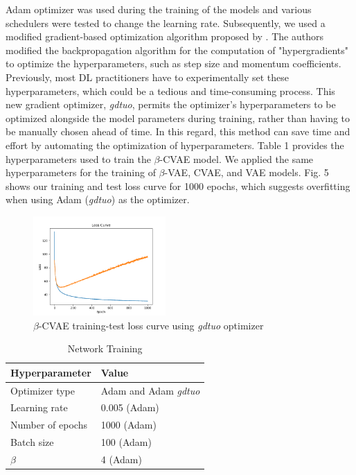 Adam optimizer was used during the training of the models and various schedulers were tested to change the learning rate. Subsequently, we used a modified gradient-based optimization algorithm proposed by \cite{DBLP:journals/corr/abs-1909-13371}. The authors modified the backpropagation algorithm for the computation of "hypergradients" to optimize the hyperparameters, such as step size and momentum coefficients. Previously, most DL practitioners have to experimentally set these hyperparameters, which could be a tedious and time-consuming process. This new gradient optimizer, \textit{gdtuo}, permits the optimizer's hyperparameters to be optimized alongside the model parameters during training, rather than having to be manually chosen ahead of time. In this regard, this method can save time and effort by automating the optimization of hyperparameters. Table 1 provides the hyperparameters used to train the $\beta$-CVAE model. We applied the same hyperparameters for the training of $\beta$-VAE, CVAE, and VAE models. Fig. 5 shows our training and test loss curve for 1000 epochs, which suggests overfitting when using  Adam (\textit{gdtuo}) as the optimizer.

\begin{figure}[htbp]
    \centerline{\includegraphics[width=0.45\textwidth]{overfitting.png}}
    \caption{$\beta$-CVAE training-test loss curve using \textit{gdtuo} optimizer}
    \label{fig}
\end{figure}

\begin{table}[htbp]
\caption{Network Training}
\centering
        \begin{tabular}{ll}
        \hline
        Hyperparameter & Value \\ \hline
        Optimizer type & Adam and Adam \textit{gdtuo} \\
        Learning rate & 0.005 (Adam) \\
        Number of epochs & 1000 (Adam) \\
        Batch size & 100 (Adam) \\
        $\beta$ & 4 (Adam) \\ \hline
        \end{tabular}
        \label{tab1}
\end{table}

